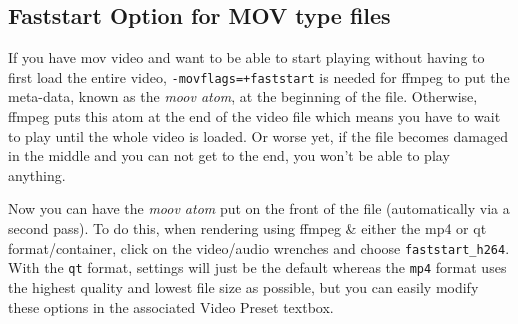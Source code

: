 \subsection{Faststart Option for MOV type files}%
\label{sub:faststart_option_mov0}

If you have mov video and want to be able to start playing without having to first load the entire video, \texttt{-movflags=+faststart} is needed for ffmpeg to put the meta-data, known as the \textit{moov atom}, at the beginning of the file.  Otherwise, ffmpeg puts this atom at the end of the video file which means you have to wait to play until the whole video is loaded.  Or worse yet, if the file becomes damaged in the middle and you can not get to the end, you won’t be able to play anything.

Now you can have the \textit{moov atom} put on the front of the file (automatically via a second pass).  To do this, when rendering using ffmpeg \& either the mp4 or qt format/container, click on the video/audio wrenches and choose \texttt{faststart\_h264}.   With the \texttt{qt} format, settings will just be the default whereas the \texttt{mp4} format uses the highest quality and lowest file size as possible, but you can easily modify these options in the associated Video Preset textbox.

